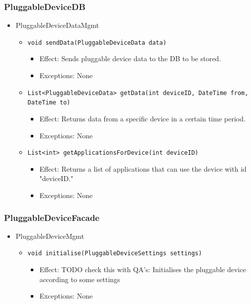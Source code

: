     \subsubsection{PluggableDeviceDB}
    \begin{itemize}
        \item PluggableDeviceDataMgmt
        \begin{itemize}
            \item \texttt{void sendData(PluggableDeviceData data)}
            \begin{itemize}
                \item Effect: Sends pluggable device data to the DB to be stored.
                \item Exceptions: None
            \end{itemize}
            \item \texttt{List<PluggableDeviceData> getData(int deviceID, DateTime from, DateTime to)}
            \begin{itemize}
                \item Effect: Returns data from a specific device in a certain time period.
                \item Exceptions: None
            \end{itemize}
            \item \texttt{List<int> getApplicationsForDevice(int deviceID)}
            \begin{itemize}
                \item Effect: Returns a list of applications that can use the device with id "deviceID."
                \item Exceptions: None
            \end{itemize}
        \end{itemize}
    \end{itemize}

    \subsubsection{PluggableDeviceFacade}
    \begin{itemize}
    	\item PluggableDeviceMgmt
    	\begin{itemize}
            \item \texttt{void initialise(PluggableDeviceSettings settings)}
            \begin{itemize}
                \item Effect: TODO check this with QA's: Initialises the pluggable device according to some settings
                \item Exceptions: None
            \end{itemize}
    	\end{itemize}
    \end{itemize}

